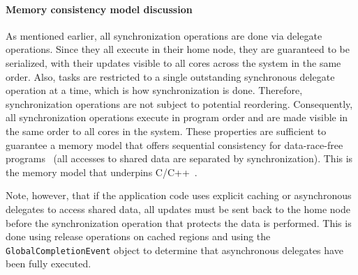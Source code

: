\paragraph{Memory consistency model discussion} As mentioned earlier, all
synchronization operations are done via delegate operations. Since they all
execute in their home node, they are guaranteed to be serialized, with their
updates visible to all cores across the system in the same order. Also, tasks
are restricted to a single outstanding synchronous delegate operation at a
time, which is how synchronization is done. Therefore, synchronization operations are not subject to potential reordering. 
Consequently, all synchronization operations execute in program order and are
made visible in the same order to all cores in the system. These properties
are sufficient to guarantee a memory model that offers sequential consistency
for data-race-free programs~\cite{AdveHill1990} (all accesses to shared data
are separated by synchronization). This is the memory model that underpins
C/C++~\cite{N2480,N2800}.

Note, however, that if the application code uses explicit caching or
asynchronous delegates to access shared data, all updates must be sent back to
the home node before the synchronization operation that protects the data is
performed. This is done using release operations on cached regions and using the \texttt{GlobalCompletionEvent} object to determine that asynchronous delegates have been fully executed. 




